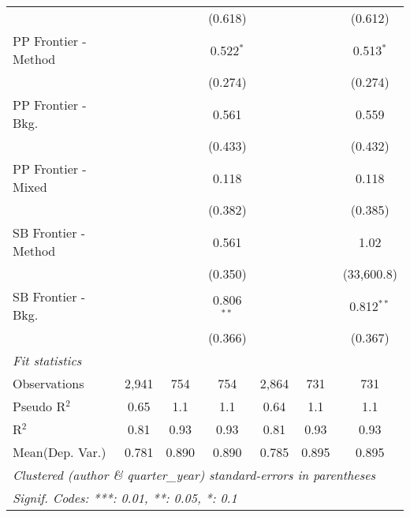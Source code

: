 \begin{tabular}{lcccccc}
                        &         &             & (0.618)      &         &             & (0.612)\\   
   PP Frontier - Method &         &             & 0.522$^{*}$  &         &             & 0.513$^{*}$\\   
                        &         &             & (0.274)      &         &             & (0.274)\\   
   PP Frontier - Bkg.   &         &             & 0.561        &         &             & 0.559\\   
                        &         &             & (0.433)      &         &             & (0.432)\\   
   PP Frontier - Mixed  &         &             & 0.118        &         &             & 0.118\\   
                        &         &             & (0.382)      &         &             & (0.385)\\   
   SB Frontier - Method &         &             & 0.561        &         &             & 1.02\\   
                        &         &             & (0.350)      &         &             & (33,600.8)\\   
   SB Frontier - Bkg.   &         &             & 0.806$^{**}$ &         &             & 0.812$^{**}$\\   
                        &         &             & (0.366)      &         &             & (0.367)\\   
   \midrule
   \emph{Fit statistics}\\
   Observations         & 2,941   & 754         & 754          & 2,864   & 731         & 731\\  
   Pseudo R$^2$         & 0.65    & 1.1         & 1.1          & 0.64    & 1.1         & 1.1\\  
   R$^2$                & 0.81    & 0.93        & 0.93         & 0.81    & 0.93        & 0.93\\  
Mean(Dep. Var.) & 0.781 & 0.890 & 0.890 & 0.785 & 0.895 & 0.895 \\
   \midrule \midrule
   \multicolumn{7}{l}{\emph{Clustered (author \& quarter\_year) standard-errors in parentheses}}\\
   \multicolumn{7}{l}{\emph{Signif. Codes: ***: 0.01, **: 0.05, *: 0.1}}\\
\end{tabular}
\par\endgroup
